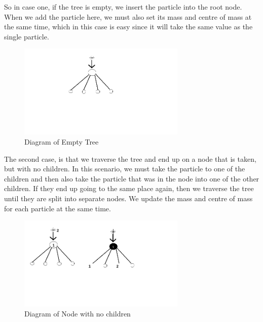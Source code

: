 \documentclass{article}
\begin{document}
So in case one, if the tree is empty, we insert the particle into the root node. When we add the particle here, we must also set its mass and centre of mass at the same time, which in this case is easy since it will take the same value as the single particle.\vspace{0.3cm}
\begin{figure}[htb]
\begin{center}
\includegraphics[width=8cm]{images/empty_tree.png}
\caption{Diagram of Empty Tree}
\end{center}
\end{figure}

The second case, is that we traverse the tree and end up on a node that is taken, but with no children. In this scenario, we must take the particle to one of the children and then also take the particle that was in the node into one of the other children. If they end up going to the same place again, then we traverse the tree until they are split into separate nodes. We update the mass and centre of mass for each particle at the same time.\vspace{0.3cm}
\begin{figure}[htb]
\begin{center}
\includegraphics[width=8cm]{images/node_no_children.png}
\caption{Diagram of Node with no children}
\end{center}
\end{figure}
\end{document}
